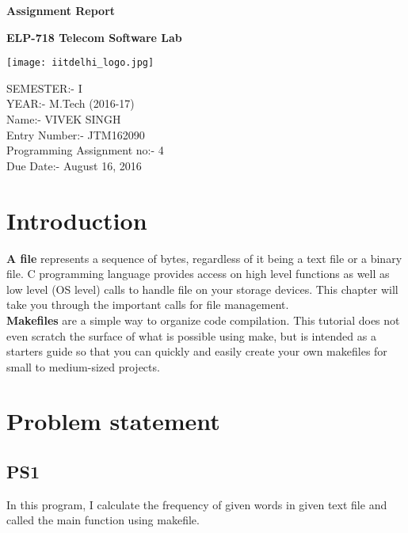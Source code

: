 \documentclass[11pt,a4paper]{article}
\begin{document}
\centering
\textbf{\Huge{Assignment Report}}
\vspace{10.3mm}

\textbf{\LARGE ELP-718 Telecom Software Lab}
\vspace{11mm}

\texttt{[image: iitdelhi\_logo.jpg]}
\vspace{11mm}


\centering
\Large SEMESTER:- I\\

YEAR:- M.Tech (2016-17)\\
\vspace{10mm}
Name:- VIVEK SINGH\\
Entry Number:- JTM162090\\
\vspace{10mm}
Programming Assignment no:- 4\\
Due Date:- August 16, 2016 








\newpage

\tableofcontents
\newpage
\section{Introduction}
\flushleft
\textbf{A file} represents a sequence of bytes, regardless of it being a text file or a binary file. C programming language provides access on high level functions as well as low level (OS level) calls to handle file on your storage devices. This chapter will take you through the important calls for file management.\\
\textbf{Makefiles} are a simple way to organize code compilation. This tutorial does not even scratch the surface of what is possible using make, but is intended as a starters guide so that you can quickly and easily create your own makefiles for small to medium-sized projects.



\newpage
\section{Problem statement}





\subsection{PS1}
\begin{flushleft}


In this program, I calculate the frequency of given words in given text file and called the main function using makefile.  
\end{flushleft}
\end{document}
